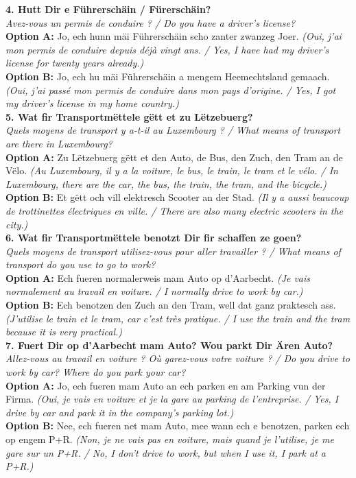 \noindent\textbf{4. Hutt Dir e Führerschäin / Fürerschäin?}\\
\textit{Avez-vous un permis de conduire ? / Do you have a driver's license?}\\
\textbf{Option A:} Jo, ech hunn mäi Führerschäin scho zanter zwanzeg Joer. \textit{(Oui, j'ai mon permis de conduire depuis déjà vingt ans. / Yes, I have had my driver's license for twenty years already.)}\\
\textbf{Option B:} Jo, ech hu mäi Führerschäin a mengem Heemechtsland gemaach. \textit{(Oui, j'ai passé mon permis de conduire dans mon pays d'origine. / Yes, I got my driver's license in my home country.)}\\[1em]

\noindent\textbf{5. Wat fir Transportmëttele gëtt et zu Lëtzebuerg?}\\
\textit{Quels moyens de transport y a-t-il au Luxembourg ? / What means of transport are there in Luxembourg?}\\
\textbf{Option A:} Zu Lëtzebuerg gëtt et den Auto, de Bus, den Zuch, den Tram an de Vëlo. \textit{(Au Luxembourg, il y a la voiture, le bus, le train, le tram et le vélo. / In Luxembourg, there are the car, the bus, the train, the tram, and the bicycle.)}\\
\textbf{Option B:} Et gëtt och vill elektresch Scooter an der Stad. \textit{(Il y a aussi beaucoup de trottinettes électriques en ville. / There are also many electric scooters in the city.)}\\[1em]

\noindent\textbf{6. Wat fir Transportmëttele benotzt Dir fir schaffen ze goen?}\\
\textit{Quels moyens de transport utilisez-vous pour aller travailler ? / What means of transport do you use to go to work?}\\
\textbf{Option A:} Ech fueren normalerweis mam Auto op d'Aarbecht. \textit{(Je vais normalement au travail en voiture. / I normally drive to work by car.)}\\
\textbf{Option B:} Ech benotzen den Zuch an den Tram, well dat ganz praktesch ass. \textit{(J'utilise le train et le tram, car c'est très pratique. / I use the train and the tram because it is very practical.)}\\[1em]

\noindent\textbf{7. Fuert Dir op d’Aarbecht mam Auto? Wou parkt Dir Ären Auto?}\\
\textit{Allez-vous au travail en voiture ? Où garez-vous votre voiture ? / Do you drive to work by car? Where do you park your car?}\\
\textbf{Option A:} Jo, ech fueren mam Auto an ech parken en am Parking vun der Firma. \textit{(Oui, je vais en voiture et je la gare au parking de l'entreprise. / Yes, I drive by car and park it in the company's parking lot.)}\\
\textbf{Option B:} Nee, ech fueren net mam Auto, mee wann ech e benotzen, parken ech op engem P+R. \textit{(Non, je ne vais pas en voiture, mais quand je l'utilise, je me gare sur un P+R. / No, I don't drive to work, but when I use it, I park at a P+R.)}\\[1em]

